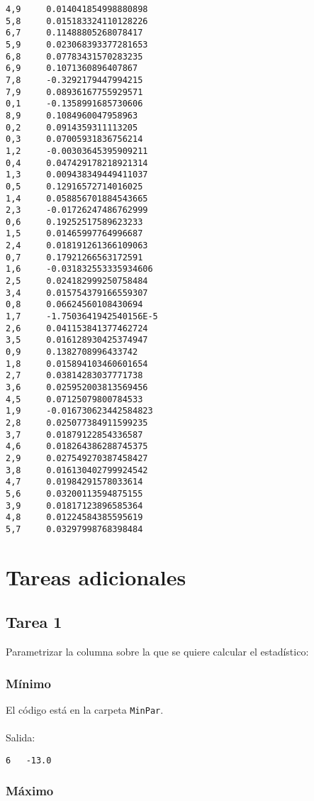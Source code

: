 \begin{lstlisting}
4,9     0.014041854998880898
5,8     0.015183324110128226
6,7     0.11488805268078417
5,9     0.023068393377281653
6,8     0.07783431570283235
6,9     0.1071360896407867
7,8     -0.3292179447994215
7,9     0.08936167755929571
0,1     -0.1358991685730606
8,9     0.1084960047958963
0,2     0.0914359311113205
0,3     0.07005931836756214
1,2     -0.00303645395909211
0,4     0.047429178218921314
1,3     0.009438349449411037
0,5     0.12916572714016025
1,4     0.058856701884543665
2,3     -0.01726247486762999
0,6     0.19252517589623233
1,5     0.01465997764996687
2,4     0.018191261366109063
0,7     0.17921266563172591
1,6     -0.031832553335934606
2,5     0.024182999250758484
3,4     0.015754379166559307
0,8     0.06624560108430694
1,7     -1.7503641942540156E-5
2,6     0.041153841377462724
3,5     0.016128930425374947
0,9     0.1382708996433742
1,8     0.015894103460601654
2,7     0.03814283037771738
3,6     0.025952003813569456
4,5     0.07125079800784533
1,9     -0.016730623442584823
2,8     0.025077384911599235
3,7     0.01879122854336587
4,6     0.018264386288745375
2,9     0.027549270387458427
3,8     0.016130402799924542
4,7     0.01984291578033614
5,6     0.03200113594875155
3,9     0.01817123896585364
4,8     0.01224584385595619
5,7     0.03297998768398484
\end{lstlisting}

\section{Tareas adicionales}

\subsection{Tarea 1}

Parametrizar la columna sobre la que se quiere calcular el estadístico:

\subsubsection{Mínimo}

El código está en la carpeta \texttt{MinPar}.
\\ \\
Salida:

\begin{lstlisting}
6   -13.0
\end{lstlisting}

\subsubsection{Máximo}


